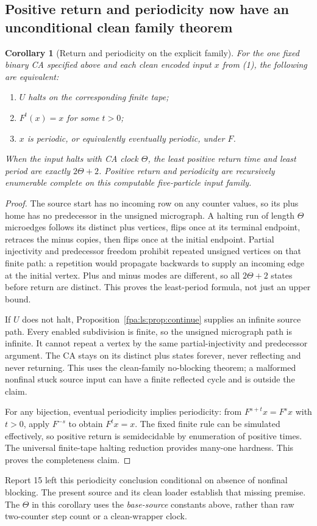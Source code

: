 \documentclass[11pt,a4paper]{article}
\numberwithin{equation}{section}
\newtheorem{corollary}[theorem]{Corollary}
\begin{document}
\subsection{Positive return and periodicity now have an unconditional clean family theorem}
\begin{corollary}[Return and periodicity on the explicit family]\label{fpa:ls:cor:period}
For the one fixed binary CA specified above and each clean encoded input $x$
from (1), the following are equivalent:
\begin{enumerate}
\item $U$ halts on the corresponding finite tape;
\item $F^t(x)=x$ for some $t>0$;
\item $x$ is periodic, or equivalently eventually periodic, under $F$.
\end{enumerate}
When the input halts with CA clock $\Theta$, the least positive return time
and least period are exactly $2\Theta+2$. Positive return and periodicity
are recursively enumerable complete on this computable five-particle input
family.
\end{corollary}
\begin{proof}
The source start has no incoming row on any counter values, so its plus
home has no predecessor in the unsigned micrograph. A halting run of length
$\Theta$ microedges follows its distinct plus vertices, flips once at its
terminal endpoint, retraces the minus copies, then flips once at the initial
endpoint. Partial injectivity and predecessor freedom prohibit repeated
unsigned vertices on that finite path: a repetition would propagate
backwards to supply an incoming edge at the initial vertex. Plus and minus
modes are different, so all $2\Theta+2$ states before return are distinct.
This proves the least-period formula, not just an upper bound.

If $U$ does not halt, Proposition~\ref{fpa:ls:prop:continue} supplies an infinite
source path. Every enabled subdivision is finite, so the unsigned micrograph
path is infinite. It cannot repeat a vertex by the same partial-injectivity
and predecessor argument. The CA stays on its distinct plus states forever,
never reflecting and never returning. This uses the clean-family
no-blocking theorem; a malformed nonfinal stuck source input can have a
finite reflected cycle and is outside the claim.

For any bijection, eventual periodicity implies periodicity: from
$F^{s+t}x=F^s x$ with $t>0$, apply $F^{-s}$ to obtain $F^t x=x$.
The fixed finite rule can be simulated effectively, so positive return is
semidecidable by enumeration of positive times. The universal finite-tape
halting reduction provides many-one hardness. This proves the completeness
claim.
\end{proof}
Report 15 left this periodicity conclusion conditional on absence of
nonfinal blocking. The present source and its clean loader establish that
missing premise. The $\Theta$ in this corollary uses the \emph{base-source}
constants above, rather than raw two-counter step count or a clean-wrapper
clock.
\end{document}
